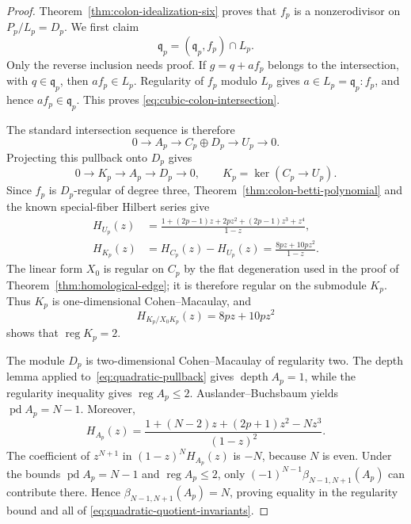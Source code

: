 \documentclass[11pt]{article}
\theoremstyle{definition}
\theoremstyle{remark}
\begin{document}
\begin{proof}
Theorem~\ref{thm:colon-idealization-six} proves that \(f_p\) is a nonzerodivisor on
\(P_p/L_p=D_p\). We first claim
\begin{equation}
\mathfrak q_p=(\mathfrak q_p,f_p)\cap L_p.
\label{eq:cubic-colon-intersection}
\end{equation}
Only the reverse inclusion needs proof. If \(g=q+af_p\) belongs to the intersection, with
\(q\in\mathfrak q_p\), then \(af_p\in L_p\). Regularity of \(f_p\) modulo \(L_p\) gives
\(a\in L_p=\mathfrak q_p:f_p\), and hence \(af_p\in\mathfrak q_p\). This proves
\eqref{eq:cubic-colon-intersection}.

The standard intersection sequence is therefore
\[
0\longrightarrow A_p\longrightarrow C_p\oplus D_p
 \longrightarrow U_p\longrightarrow0.
\]
Projecting this pullback onto \(D_p\) gives
\begin{equation}
0\longrightarrow K_p\longrightarrow A_p\longrightarrow D_p\longrightarrow0,
\qquad K_p=\ker(C_p\longrightarrow U_p).
\label{eq:quadratic-pullback}
\end{equation}
Since \(f_p\) is \(D_p\)-regular of degree three, Theorem~\ref{thm:colon-betti-polynomial}
and the known special-fiber Hilbert series give
\begin{align*}
H_{U_p}(z)
 &=\frac{1+(2p-1)z+2pz^2+(2p-1)z^3+z^4}{1-z},\\
H_{K_p}(z)
 &=H_{C_p}(z)-H_{U_p}(z)
   =\frac{8pz+10pz^2}{1-z}.
\end{align*}
The linear form \(X_0\) is regular on \(C_p\) by the flat degeneration used in the proof of
Theorem~\ref{thm:homological-edge}; it is therefore regular on the submodule \(K_p\). Thus \(K_p\)
is one-dimensional Cohen--Macaulay, and
\[
H_{K_p/X_0K_p}(z)=8pz+10pz^2
\]
shows that \(\operatorname{reg}K_p=2\).

The module \(D_p\) is two-dimensional Cohen--Macaulay of regularity two. The depth lemma applied
to~\eqref{eq:quadratic-pullback} gives \(\operatorname{depth}A_p=1\), while the regularity
inequality gives \(\operatorname{reg}A_p\le2\). Auslander--Buchsbaum yields
\(\operatorname{pd}A_p=N-1\). Moreover,
\begin{equation}
H_{A_p}(z)=
\frac{1+(N-2)z+(2p+1)z^2-Nz^3}{(1-z)^2}.
\label{eq:quadratic-quotient-hilbert}
\end{equation}
The coefficient of \(z^{N+1}\) in \((1-z)^NH_{A_p}(z)\) is \(-N\), because \(N\) is even.
Under the bounds \(\operatorname{pd}A_p=N-1\) and \(\operatorname{reg}A_p\le2\), only
\((-1)^{N-1}\beta_{N-1,N+1}(A_p)\) can contribute there. Hence
\(\beta_{N-1,N+1}(A_p)=N\), proving equality in the regularity bound and all of
\eqref{eq:quadratic-quotient-invariants}.


\end{proof}
\end{document}
